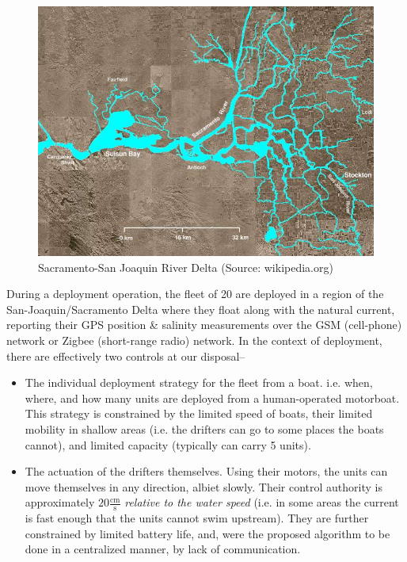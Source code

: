 \documentclass[letter,10pt]{article}
\begin{document}
\begin{figure}[h]
 \centering
 \includegraphics[width=\linewidth ]{figures/Wpdms_usgs_photo_sacramento_delta_2.jpg}
 \caption{Sacramento-San Joaquin River Delta (Source: wikipedia.org)\label{fig:fsn-delta}}
\end{figure}

During a deployment operation, the fleet of 20 are deployed in a region of the San-Joaquin/Sacramento Delta where they float along with the natural current, reporting their GPS position \& salinity measurements over the GSM (cell-phone) network or Zigbee (short-range radio) network.  In the context of deployment, there are effectively two controls at our disposal--
\begin{itemize}
 \item The individual deployment strategy for the fleet from a boat. i.e. when, where, and how many units are deployed from a human-operated motorboat.  This strategy is constrained by the limited speed of boats, their limited mobility in shallow areas (i.e. the drifters can go to some places the boats cannot), and limited capacity (typically can carry 5 units).
 \item The actuation of the drifters themselves.  Using their motors, the units can move themselves in any direction, albiet slowly.  Their control authority is approximately $20 \frac{\mbox{cm}}{\mbox{s}}$ \emph{relative to the water speed} (i.e. in some areas the current is fast enough that the units cannot swim upstream).  They are further constrained by limited battery life, and, were the proposed algorithm to be done in a centralized manner, by lack of communication.
\end{itemize}
\end{document}
